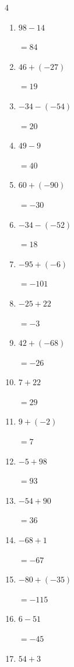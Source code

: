 \begin{multicols}{4}
\begin{enumerate}
  \item $98-14$

        $=84$

  \item $46+(-27)$

        $=19$

  \item $-34-(-54)$

        $=20$

\columnbreak %

  \item $49-9$

        $=40$

  \item $60+(-90)$

        $=-30$

  \item $-34-(-52)$

        $=18$

  \item $-95+(-6)$

        $=-101$

  \item $-25+22$

        $=-3$

  \item $42+(-68)$

        $=-26$

  \item $7+22$

        $=29$

  \item $9+(-2)$

        $=7$

  \item $-5+98$

        $=93$

  \item $-54+90$

        $=36$

  \item $-68+1$

        $=-67$

  \item $-80+(-35)$

        $=-115$

  \item $6-51$

        $=-45$

  \item $54+3$


\end{enumerate}
\end{multicols}
